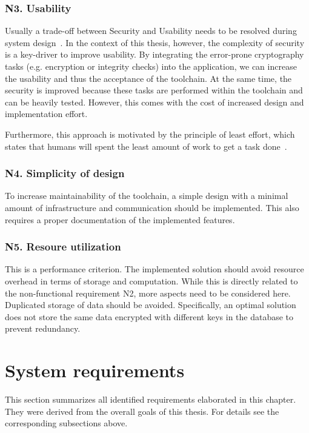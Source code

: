 \documentclass[../main.tex]{subfiles}
\begin{document}
\subsubsection{N3. Usability}
Usually a trade-off between Security and Usability needs to be resolved during system design~.
In the context of this thesis, however, the complexity of security is a key-driver to improve usability. 
By integrating the error-prone cryptography tasks (e.g. encryption or integrity checks) into the application, we can increase the usability and thus the acceptance of the toolchain.
At the same time, the security is improved because these tasks are performed within the toolchain and can be heavily tested.
However, this comes with the cost of increased design and implementation effort.

Furthermore, this approach is motivated by the principle of least effort, which states that humans will spent the least amount of work to get a task done~\cite{Levenson2018}.

\subsubsection{N4. Simplicity of design}
To increase maintainability of the toolchain, a simple design with a minimal amount of infrastructure and communication should be implemented.
This also requires a proper documentation of the implemented features.

\subsubsection{N5. Resoure utilization}
This is a performance criterion.
The implemented solution should avoid resource overhead in terms of storage and computation.
While this is directly related to the non-functional requirement N2, more aspects need to be considered here.
Duplicated storage of data should be avoided.
Specifically, an optimal solution does not store the same data encrypted with different keys in the database to prevent redundancy.


\section{System requirements}\label{system-requriements}
This section summarizes all identified requirements elaborated in this chapter.
They were derived from the overall goals of this thesis.
For details see the corresponding subsections above.
\end{document}
